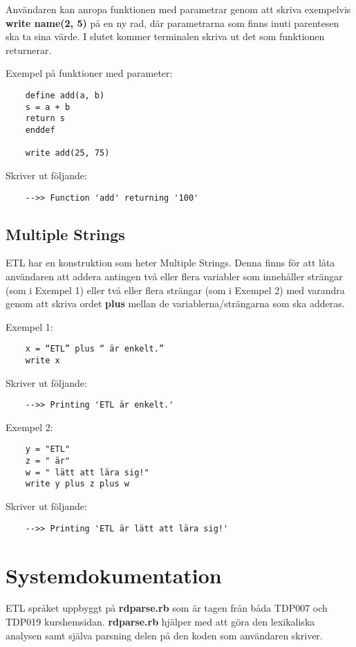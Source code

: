 \documentclass{TDP019mall}
\begin{document}
\begin{enumerate}
Användaren kan anropa funktionen med parametrar genom att skriva exempelvis \textbf{write name(2, 5)} på en ny rad, där parametrarna 
som finns inuti parentesen ska ta sina värde. I slutet kommer terminalen skriva ut det som funktionen returnerar.  
 
 
Exempel på funktioner med parameter:
\begin{verbatim}
    define add(a, b)
    s = a + b
    return s
    enddef

    write add(25, 75)
\end{verbatim}
Skriver ut följande:
\begin{verbatim}
    -->> Function 'add' returning '100'
\end{verbatim}
\end{enumerate}


\newpage
\subsection{Multiple Strings}
ETL har en konstruktion som heter Multiple Strings. Denna finns för att låta användaren att addera antingen två eller flera variabler som innehåller strängar 
(som i Exempel 1) eller två eller flera strängar (som i Exempel 2) med varandra genom att skriva ordet \textbf{plus} mellan de variablerna/strängarna som ska adderas.

Exempel 1: 
\begin{verbatim}
    x = “ETL” plus “ är enkelt.”
    write x
\end{verbatim}
Skriver ut följande:
\begin{verbatim}
    -->> Printing 'ETL är enkelt.'
\end{verbatim}

Exempel 2:

\begin{verbatim}
    y = "ETL"
    z = " är"
    w = " lätt att lära sig!"
    write y plus z plus w
\end{verbatim}
 
Skriver ut följande:
\begin{verbatim}
    -->> Printing 'ETL är lätt att lära sig!'
\end{verbatim}


\newpage
\section{Systemdokumentation}
ETL språket uppbyggt på \textbf{rdparse.rb} som är tagen från båda TDP007 och TDP019 kurshemsidan. \textbf{rdparse.rb} hjälper med att göra den lexikaliska 
analysen samt själva parsning delen på den koden som användaren skriver. 
\end{document}

